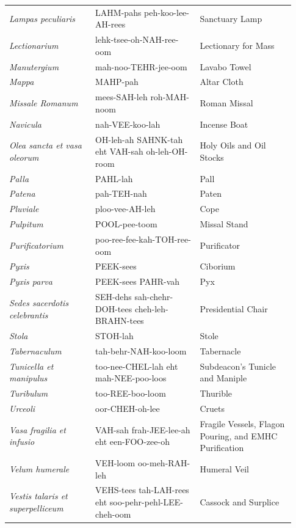 {\begin{longtable}{>{\raggedright\arraybackslash}p{0.28\linewidth}>{\raggedright\arraybackslash}p{0.34\linewidth}>{\raggedright\arraybackslash}p{0.31\linewidth}}
\textit{Lampas peculiaris} & LAHM-pahs peh-koo-lee-AH-rees & Sanctuary Lamp \\
\textit{Lectionarium} & lehk-tsee-oh-NAH-ree-oom & Lectionary for Mass \\
\textit{Manutergium} & mah-noo-TEHR-jee-oom & Lavabo Towel \\
\textit{Mappa} & MAHP-pah & Altar Cloth \\
\textit{Missale Romanum} & mees-SAH-leh roh-MAH-noom & Roman Missal \\
\textit{Navicula} & nah-VEE-koo-lah & Incense Boat \\
\textit{Olea sancta et vasa oleorum} & OH-leh-ah SAHNK-tah eht VAH-sah oh-leh-OH-room & Holy Oils and Oil Stocks \\
\textit{Palla} & PAHL-lah & Pall \\
\textit{Patena} & pah-TEH-nah & Paten \\
\textit{Pluviale} & ploo-vee-AH-leh & Cope \\
\textit{Pulpitum} & POOL-pee-toom & Missal Stand \\
\textit{Purificatorium} & poo-ree-fee-kah-TOH-ree-oom & Purificator \\
\textit{Pyxis} & PEEK-sees & Ciborium \\
\textit{Pyxis parva} & PEEK-sees PAHR-vah & Pyx \\
\textit{Sedes sacerdotis celebrantis} & SEH-dehs sah-chehr-DOH-tees cheh-leh-BRAHN-tees & Presidential Chair \\
\textit{Stola} & STOH-lah & Stole \\
\textit{Tabernaculum} & tah-behr-NAH-koo-loom & Tabernacle \\
\textit{Tunicella et manipulus} & too-nee-CHEL-lah eht mah-NEE-poo-loos & Subdeacon's Tunicle and Maniple \\
\textit{Turibulum} & too-REE-boo-loom & Thurible \\
\textit{Urceoli} & oor-CHEH-oh-lee & Cruets \\
\textit{Vasa fragilia et infusio} & VAH-sah frah-JEE-lee-ah eht een-FOO-zee-oh & Fragile Vessels, Flagon Pouring, and EMHC Purification \\
\textit{Velum humerale} & VEH-loom oo-meh-RAH-leh & Humeral Veil \\
\textit{Vestis talaris et superpelliceum} & VEHS-tees tah-LAH-rees eht soo-pehr-pehl-LEE-cheh-oom & Cassock and Surplice \\
\bottomrule
\end{longtable}}

